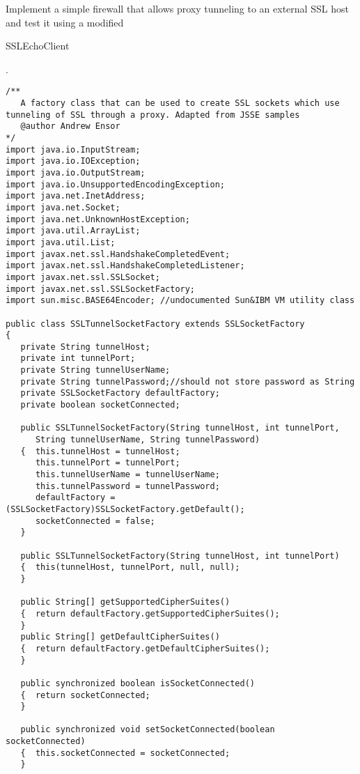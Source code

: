 \begin{exercise}
	Implement a simple firewall that allows proxy tunneling to an external SSL host
	and test it using a modified \begin{code}SSLEchoClient\end{code}.
\end{exercise}


\begin{lstlisting}[caption=SSL tunneling]
/**
   A factory class that can be used to create SSL sockets which use tunneling of SSL through a proxy. Adapted from JSSE samples
   @author Andrew Ensor
*/
import java.io.InputStream;
import java.io.IOException;
import java.io.OutputStream;
import java.io.UnsupportedEncodingException;
import java.net.InetAddress;
import java.net.Socket;
import java.net.UnknownHostException;
import java.util.ArrayList;
import java.util.List;
import javax.net.ssl.HandshakeCompletedEvent;
import javax.net.ssl.HandshakeCompletedListener;
import javax.net.ssl.SSLSocket;
import javax.net.ssl.SSLSocketFactory;
import sun.misc.BASE64Encoder; //undocumented Sun&IBM VM utility class

public class SSLTunnelSocketFactory extends SSLSocketFactory
{
   private String tunnelHost;
   private int tunnelPort;
   private String tunnelUserName;
   private String tunnelPassword;//should not store password as String
   private SSLSocketFactory defaultFactory;
   private boolean socketConnected;

   public SSLTunnelSocketFactory(String tunnelHost, int tunnelPort,
      String tunnelUserName, String tunnelPassword)
   {  this.tunnelHost = tunnelHost;
      this.tunnelPort = tunnelPort;
      this.tunnelUserName = tunnelUserName;
      this.tunnelPassword = tunnelPassword;
      defaultFactory = (SSLSocketFactory)SSLSocketFactory.getDefault();
      socketConnected = false;
   }

   public SSLTunnelSocketFactory(String tunnelHost, int tunnelPort)
   {  this(tunnelHost, tunnelPort, null, null);
   }

   public String[] getSupportedCipherSuites()
   {  return defaultFactory.getSupportedCipherSuites();
   }
   public String[] getDefaultCipherSuites()
   {  return defaultFactory.getDefaultCipherSuites();
   }

   public synchronized boolean isSocketConnected()
   {  return socketConnected;
   }

   public synchronized void setSocketConnected(boolean socketConnected)
   {  this.socketConnected = socketConnected;
   }


\end{lstlisting}
